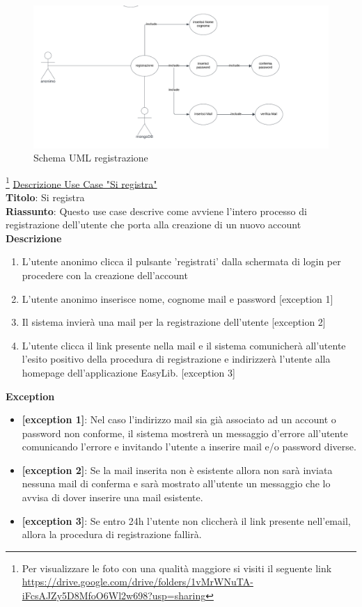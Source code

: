\documentclass{article}
\begin{document}
\begin{figure}[H]
    \centering
    \includegraphics[width=130mm]{D2/Images/registrazioneUML.png}
    \caption{Schema UML registrazione}
\end{figure}
\footnote{Per visualizzare le foto con una qualità maggiore si visiti il seguente link \url{https://drive.google.com/drive/folders/1vMrWNuTA-iFcsAJZy5D8MfoO6Wl2w698?usp=sharing}}
    \underline{Descrizione Use Case "Si registra"}\\
    \textbf{Titolo}: Si registra\\
    \textbf{Riassunto}: Questo use case descrive come avviene l'intero processo di registrazione dell'utente che porta alla creazione di un nuovo account\\
    \textbf{Descrizione}
    \begin{enumerate}
        \item L'utente anonimo clicca il pulsante 'registrati' dalla schermata di login per procedere con la creazione dell'account
        \item L'utente anonimo inserisce nome, cognome mail e password [exception 1]
        \item Il sistema invierà una mail per la registrazione dell'utente [exception 2]
        \item L'utente clicca il link presente nella mail e il sistema comunicherà all'utente l'esito positivo della procedura di registrazione e indirizzerà l'utente alla homepage dell'applicazione EasyLib. [exception 3]
    \end{enumerate}
    \textbf{Exception}
    \begin{itemize}
        \item \textbf{[exception 1]}: Nel caso l'indirizzo mail sia già associato ad un account o password non conforme, il sistema mostrerà un messaggio d'errore all'utente comunicando l'errore e invitando l'utente a inserire mail e/o password diverse.
        \item \textbf{[exception 2]}: Se la mail inserita non è esistente allora non sarà inviata nessuna mail di conferma e sarà mostrato all'utente un messaggio che lo avvisa di dover inserire una mail esistente.
        \item \textbf{[exception 3]}: Se entro 24h l'utente non cliccherà il link presente nell'email, allora la procedura di registrazione fallirà.
    \end{itemize}
\end{document}
